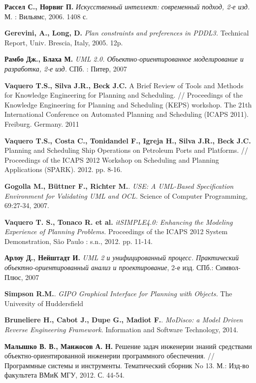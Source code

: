 \begin{thebibliography}{00}

\textbf{Рассел С., Норвиг П.} \textit{Искусственный интеллект: современный подход, 2-е изд.} М. : Вильямс, 2006. 1408 с.

\textbf{Gerevini, A., Long, D.} \textit{Plan constraints and preferences in PDDL3.} Technical Report, Univ. Brescia, Italy, 2005. 12p.


\textbf{Рамбо Дж., Блаха М.} \textit{UML 2.0. Объектно-ориентированное моделирование и разработка, 2-е изд.} СПб. : Питер, 2007

\textbf{Vaquero T.S., Silva J.R., Beck J.C.} A Brief Review of Tools and Methods for Knowledge Engineering for Planning and Scheduling.
 // Proceedings of the Knowledge Engineering for Planning and Scheduling (KEPS) workshop.
 The 21th International Conference on Automated Planning and Scheduling (ICAPS 2011). Freiburg. Germany. 2011

\textbf{Vaquero T.S., Costa C., Tonidandel F., Igreja H., Silva J.R., Beck J.C.} Planning and Scheduling Ship Operations on Petroleum Ports and Platforms.
 // Proceedings of the ICAPS 2012 Workshop on Scheduling and Planning Applications (SPARK). 2012. pp. 8-16.

\textbf{Gogolla M., Büttner F., Richter M.}. \textit{USE: A UML-Based Specification Environment for Validating UML and OCL.} Science of Computer Programming, 69:27-34, 2007.

\textbf{Vaquero T. S., Tonaco R. et al.} \textit{itSIMPLE4.0: Enhancing the Modeling Experience of Planning Problems.} Proceedings of the ICAPS 2012 System Demonstration, São Paulo : s.n., 2012. pp. 11-14.

\textbf{Арлоу Д., Нейштадт И.} \textit{UML 2 и унифицированный процесс. Практический объектно-ориентированный анализ и проектирование}, 2-е изд. СПб.: Символ-Плюс, 2007

\textbf{Simpson R.M.}. \textit{GIPO Graphical Interface for Planning with Objects.} The University of Huddersfield

\textbf{Bruneliere H., Cabot J., Dupe G., Madiot F.}. \textit{MoDisco: a Model Driven Reverse Engineering Framework}. Information and Software Technology, 2014.

\textbf{Малышко В. В., Манжосов А. Н.} Решение задач инженерии знаний средствами объектно-ориентированной инженерии программного обеспечения. // Программные системы и инструменты. Тематический сборник No 13. М.: Изд-во факультета ВМиК МГУ, 2012. С. 44-54.


\end{thebibliography}
